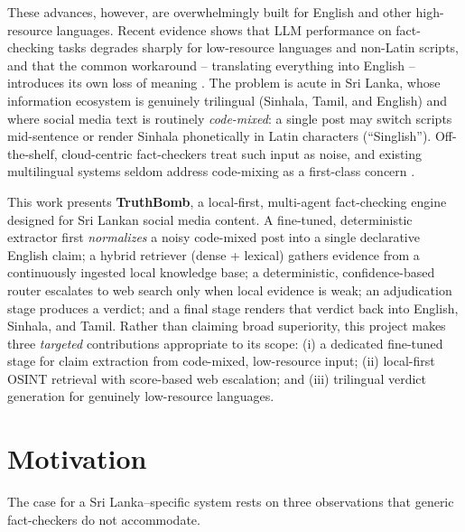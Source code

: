 \documentclass[12pt,a4paper]{article}
\begin{document}
These advances, however, are overwhelmingly built for English and other
high-resource languages. Recent evidence shows that LLM performance on
fact-checking tasks degrades sharply for low-resource languages and
non-Latin scripts, and that the common workaround -- translating everything
into English -- introduces its own loss of meaning
\cite{vykopal}. The problem is acute in Sri Lanka, whose
information ecosystem is genuinely trilingual (Sinhala, Tamil, and English)
and where social media text is routinely \emph{code-mixed}: a single post
may switch scripts mid-sentence or render Sinhala phonetically in Latin
characters (``Singlish''). Off-the-shelf, cloud-centric fact-checkers treat
such input as noise, and existing multilingual systems seldom address
code-mixing as a first-class concern \cite{hemtfake}.
 
This work presents \textbf{TruthBomb}, a local-first, multi-agent
fact-checking engine designed for Sri Lankan social media content. A
fine-tuned, deterministic extractor first \emph{normalizes} a noisy
code-mixed post into a single declarative English claim; a hybrid retriever
(dense + lexical) gathers evidence from a continuously ingested local
knowledge base; a deterministic, confidence-based router escalates to web
search only when local evidence is weak; an adjudication stage produces a
verdict; and a final stage renders that verdict back into English, Sinhala,
and Tamil. Rather than claiming broad superiority, this project makes three
\emph{targeted} contributions appropriate to its scope: (i) a dedicated
fine-tuned stage for claim extraction from code-mixed, low-resource input;
(ii) local-first OSINT retrieval with score-based web escalation; and
(iii) trilingual verdict generation for genuinely low-resource languages.


\section{Motivation}
\label{sec:motivation}
 
The case for a Sri Lanka--specific system rests on three observations that
generic fact-checkers do not accommodate.
 
\end{document}

